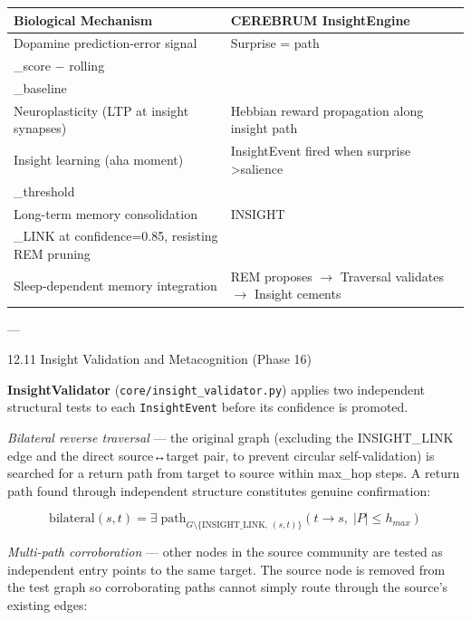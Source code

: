 \documentclass[10pt,journal,compsoc]{IEEEtran}
\begin{document}
\begin{center}
\begin{tabularx}{\columnwidth}{|>{\raggedright\arraybackslash}X|>{\raggedright\arraybackslash}X|}
\hline
Biological Mechanism & CEREBRUM InsightEngine \\ \hline
Dopamine prediction-error signal & Surprise = path\\_score $-$ rolling\\_baseline \\ \hline
Neurop\-lasticity (LTP at insight synapses) & Hebbian reward propagation along insight path \\ \hline
Insight learning (aha moment) & InsightEvent fired when surprise \textgreater  salience\\_threshold \\ \hline
Long-term memory conso\-lidation & INSIGHT\\_LINK at confidence=0.85, resisting REM pruning \\ \hline
Sleep-dependent memory integration & REM proposes $\to$ Traversal validates $\to$ Insight cements \\ \hline
\end{tabularx}
\end{center}

---

12.11 Insight Validation and Metaco\-gnition (Phase 16)

\textbf{InsightValidator} (\texttt{core/insight\_validator.py}) applies two independent structural tests to each \texttt{InsightEvent} before its confidence is promoted.

\textit{Bilateral reverse traversal} — the original graph (excluding the INSIGHT\_LINK edge and the direct source↔target pair, to prevent circular self-validation) is searched for a return path from target to source within max\_hop steps. A return path found through independent structure constitutes genuine confi\-rmation:

\begin{equation}
\text{bilateral}(s, t) = \exists\; \text{path}_{G \setminus \{\text{INSIGHT\_LINK},\,(s,t)\}}(t \to s,\; |P| \leq h_{max})
\end{equation}

\textit{Multi-path corro\-boration} — other nodes in the source community are tested as independent entry points to the same target. The source node is removed from the test graph so corro\-borating paths cannot simply route through the source's existing edges:
\end{document}
